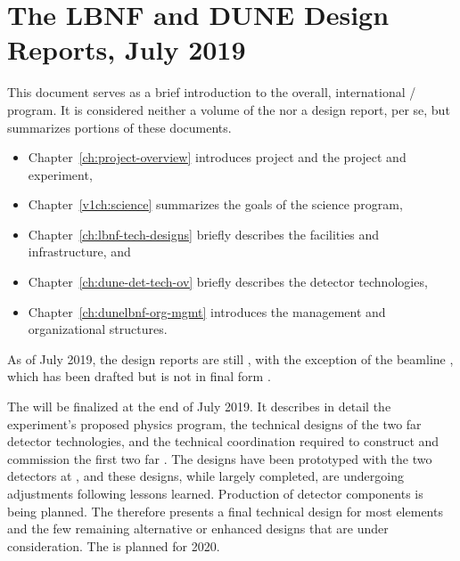 \chapter{The LBNF and DUNE Design Reports, July 2019}

\begin{comment}
The international \dword{dune} experiment is designing a world-class, dual-site  long-baseline neutrino observatory and nucleon decay experiment to answer fundamental questions about the nature of elementary particles and their role in the universe. The \dword{lbnf} project is constructing the facilities and infrastructure at \dword{fnal} (the near site) and \dword{surf}, in Lead, SD, USA (the far site), to house and support the experiment. The \dword{lbnf}/\dword{dune} program is hosted at \dword{fnal}, in Batavia, IL, USA.
\end{comment}

This document serves as a brief introduction to the overall, international / program. It is considered neither a volume of the    nor a  design report, per se, but summarizes portions of  these documents. 
\begin{itemize}
    \item Chapter~\ref{ch:project-overview} introduces  project and the  project and experiment,
    \item Chapter~\ref{v1ch:science} summarizes the goals of the   science program,
    \item Chapter~\ref{ch:lbnf-tech-designs} briefly describes the  facilities and infrastructure, and 
    \item Chapter~\ref{ch:dune-det-tech-ov} briefly describes the  detector technologies, 
    \item Chapter~\ref{ch:dunelbnf-org-mgmt} introduces the management and organizational structures.
\end{itemize}


As of July 2019, the  design reports are still , with the exception of the  beamline ,  which has been drafted but is not in final form \cite{lbnfdesignrptslinks}.


The   will be finalized at the end of July 2019. It describes in detail the experiment's proposed physics program, the 
technical designs of the two far detector  technologies, and the technical coordination required to construct and commission the first two far . The designs have been prototyped with the two  detectors at , and these designs, while largely completed, are undergoing adjustments following lessons learned. Production of detector components is being planned. 
The   therefore presents a final technical design for most elements and the few remaining alternative or enhanced designs that are under consideration. The   is planned for 2020.

